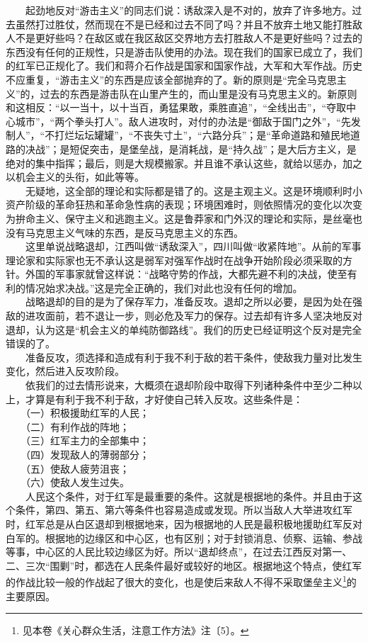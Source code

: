 \documentclass[cn,11pt,chinese]{elegantbook}
\begin{document}
　　起劲地反对“游击主义”的同志们说：诱敌深入是不对的，放弃了许多地方。过去虽然打过胜仗，然而现在不是已经和过去不同了吗？并且不放弃土地又能打胜敌人不是更好些吗？在敌区或在我区敌区交界地方去打胜敌人不是更好些吗？过去的东西没有任何的正规性，只是游击队使用的办法。现在我们的国家已成立了，我们的红军已正规化了。我们和蒋介石作战是国家和国家作战，大军和大军作战。历史不应重复，“游击主义”的东西是应该全部抛弃的了。新的原则是“完全马克思主义”的，过去的东西是游击队在山里产生的，而山里是没有马克思主义的。新原则和这相反：“以一当十，以十当百，勇猛果敢，乘胜直追”，“全线出击”，“夺取中心城市”，“两个拳头打人”。敌人进攻时，对付的办法是“御敌于国门之外”，“先发制人”，“不打烂坛坛罐罐”，“不丧失寸土”，“六路分兵”；是“革命道路和殖民地道路的决战”；是短促突击，是堡垒战，是消耗战，是“持久战”；是大后方主义，是绝对的集中指挥；最后，则是大规模搬家。并且谁不承认这些，就给以惩办，加之以机会主义的头衔，如此等等。\\
　　无疑地，这全部的理论和实际都是错了的。这是主观主义。这是环境顺利时小资产阶级的革命狂热和革命急性病的表现；环境困难时，则依照情况的变化以次变为拚命主义、保守主义和逃跑主义。这是鲁莽家和门外汉的理论和实际，是丝毫也没有马克思主义气味的东西，是反马克思主义的东西。\\
　　这里单说战略退却，江西叫做“诱敌深入”，四川叫做“收紧阵地”。从前的军事理论家和实际家也无不承认这是弱军对强军作战时在战争开始阶段必须采取的方针。外国的军事家就曾这样说：“战略守势的作战，大都先避不利的决战，使至有利的情况始求决战。”这是完全正确的，我们对此也没有任何的增加。\\
　　战略退却的目的是为了保存军力，准备反攻。退却之所以必要，是因为处在强敌的进攻面前，若不退让一步，则必危及军力的保存。过去却有许多人坚决地反对退却，认为这是“机会主义的单纯防御路线”。我们的历史已经证明这个反对是完全错误的了。\\
　　准备反攻，须选择和造成有利于我不利于敌的若干条件，使敌我力量对比发生变化，然后进入反攻阶段。\\
　　依我们的过去情形说来，大概须在退却阶段中取得下列诸种条件中至少二种以上，才算是有利于我不利于敌，才好使自己转入反攻。这些条件是：\\
　　（一）积极援助红军的人民；\\
　　（二）有利作战的阵地；\\
　　（三）红军主力的全部集中；\\
　　（四）发现敌人的薄弱部分；\\
　　（五）使敌人疲劳沮丧；\\
　　（六）使敌人发生过失。\\
　　人民这个条件，对于红军是最重要的条件。这就是根据地的条件。并且由于这个条件，第四、第五、第六等条件也容易造成或发现。所以当敌人大举进攻红军时，红军总是从白区退却到根据地来，因为根据地的人民是最积极地援助红军反对白军的。根据地的边缘区和中心区，也有区别；对于封锁消息、侦察、运输、参战等事，中心区的人民比较边缘区为好。所以“退却终点”，在过去江西反对第一、二、三次“围剿”时，都选在人民条件最好或较好的地区。根据地这个特点，使红军的作战比较一般的作战起了很大的变化，也是使后来敌人不得不采取堡垒主义\footnote[40]{ 见本卷《关心群众生活，注意工作方法》注〔5〕。}的主要原因。\\
\end{document}
